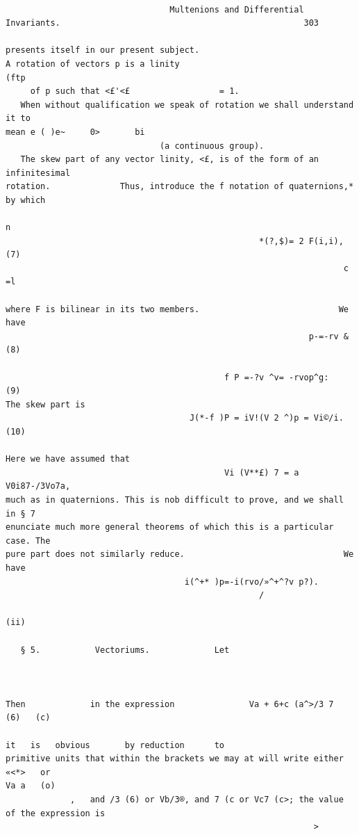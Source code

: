 \documentclass[10pt]{article}
\begin{document}
\clearpage
\begin{verbatim}

                                 Multenions and Differential Invariants.                                                 303

presents itself in our present subject.                                       A rotation of vectors p is a linity
(ftp
     of p such that <£'<£                  = 1.
   When without qualification we speak of rotation we shall understand it to
mean e ( )e~     0>       bi
                               (a continuous group).
   The skew part of any vector linity, <£, is of the form of an infinitesimal
rotation.              Thus, introduce the f notation of quaternions,* by which
                                                                        n
                                                   *(?,$)= 2 F(i,i),                                                          (7)
                                                                    c   =l

where F is bilinear in its two members.                            We have
                                                             p-=-rv &                                                         (8)

                                            f P =-?v ^v= -rvop^g:                                                             (9)
The skew part is
                                     J(*-f )P = iV!(V 2 ^)p = Vi©/i.                                                     (10)

Here we have assumed that
                                            Vi (V**£) 7 = a V0i87-/3Vo7a,
much as in quaternions. This is nob difficult to prove, and we shall in § 7
enunciate much more general theorems of which this is a particular case. The
pure part does not similarly reduce.                                We have
                                    i(^+* )p=-i(rvo/»^+^?v p?).
                                                   /
                                                                                                                         (ii)

   § 5.           Vectoriums.             Let



Then             in the expression               Va + 6+c (a^>/3 7      (6)   (c)
                                                                                    it   is   obvious       by reduction      to
primitive units that within the brackets we may at will write either                                                   «<*>   or
Va a   (o)
             ,   and /3 (6) or Vb/3®, and 7 (c or Vc7 (c>; the value of the expression is
                                                              >





\end{verbatim}
\end{document}
